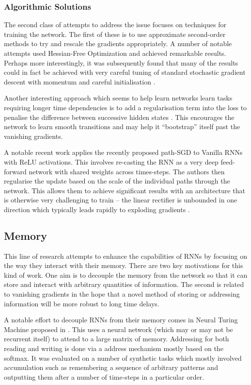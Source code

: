 \subsubsection{Algorithmic Solutions}
The second class of attempts to address the issue focuses on techniques for training the network.
 The first of these is to use approximate
second-order methods to try and rescale the gradients appropriately. A number of notable attempts
used Hessian-Free Optimization \autocite{Martens2011, Boulanger-Lewandowski2012} and achieved
remarkable results. Perhaps more interestingly, it was subsequently found that many of the results
could in fact be achieved with very careful tuning of standard stochastic gradient descent with
momentum and careful initialisation \autocite{Sutskever2013a}.

Another interesting approach which seems to help learn networks learn tasks requiring longer time
dependencies is to add a regularisation term into the loss to penalise the difference between
successive hidden states \autocite{Krueger2016}. This encourages the network to learn smooth
transitions and may help it ``bootstrap'' itself past the vanishing gradients.

A notable recent work applies the recently proposed path-SGD \autocite{Neyshabur2015} to Vanilla
RNNs with ReLU activations. This involves re-casting the RNN as a very deep feed-forward network with
shared weights across times-steps. The authors then regularise the update based on the scale of
the individual paths through the network. This allows them to achieve significant results with an
architecture that is otherwise very challenging to train -- the linear rectifier is unbounded in
one direction which typically leads rapidly to exploding gradients \autocite{Neyshabur2016}.


\subsection{Memory}
This line of research attempts to enhance the capabilities of RNNs by focusing on the way they
interact with their memory. There are two key motivations for this kind of work. 
One aim is to decouple the memory from the network so that it can store and interact with arbitrary
quantities of information. The second is related to vanishing gradients in the hope that a novel
method of storing or addressing information will be more robust to long time delays.

A notable effort to decouple RNNs from their memory comes in Neural Turing Machine proposed in
\autocite{Graves2014}. This uses a neural network (which may or may not be recurrent itself) to
attend to a large matrix of memory. Addressing for both reading and writing is done via a
address mechanism mostly based on the softmax. It was evaluated on a number of synthetic tasks
which mostly involved accumulation such as remembering a sequence of arbitrary patterns and outputting
them after a number of time-steps in a particular order.

